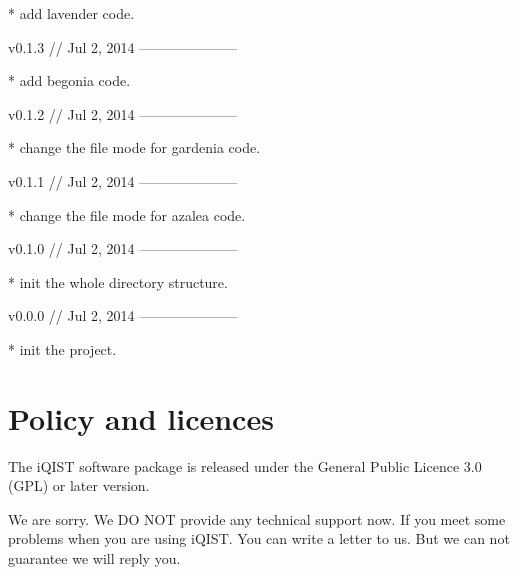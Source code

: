 * add lavender code.


v0.1.3 // Jul 2, 2014
---------------------

* add begonia code.


v0.1.2 // Jul 2, 2014
---------------------

* change the file mode for gardenia code.


v0.1.1 // Jul 2, 2014
---------------------

* change the file mode for azalea code.


v0.1.0 // Jul 2, 2014
---------------------

* init the whole directory structure.


v0.0.0 // Jul 2, 2014
---------------------

* init the project.


\section{Policy and licences}

The iQIST software package is released under the General Public Licence
 3.0 (GPL) or later version.

We are sorry. We DO NOT provide any technical support now. If you meet
some problems when you are using iQIST. You can write a letter to us. But
we can not guarantee we will reply you.
